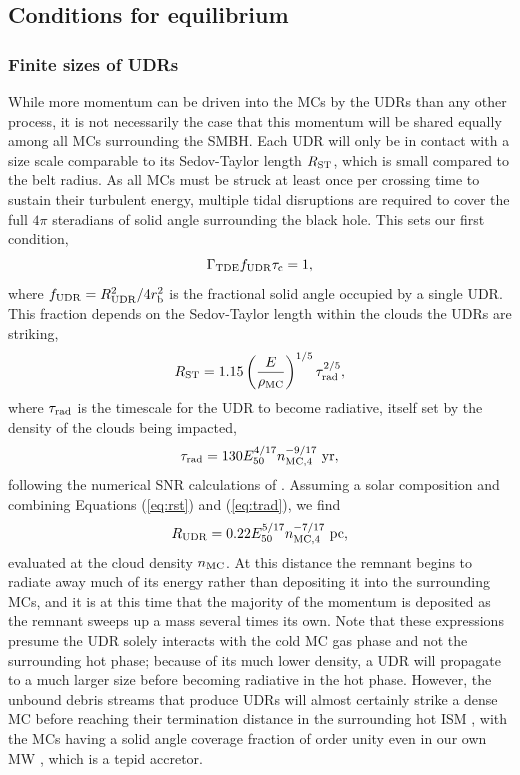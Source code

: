 \documentclass[preprint2]{aastex}
\begin{document}
\subsection{Conditions for equilibrium}\label{subsec:conditions}

\subsubsection{Finite sizes of UDRs}

While more momentum can be driven into the MCs by the UDRs than any other process, it is not necessarily the case that this momentum will be shared equally among all MCs surrounding the SMBH. Each UDR will only be in contact with a size scale comparable to its Sedov-Taylor length $R_{\rm ST}$, which is small compared to the belt radius. As all MCs must be struck at least once per crossing time to sustain their turbulent energy, multiple tidal disruptions are required to cover the full $4\pi$ steradians of solid angle surrounding the black hole. This sets our first condition,
\begin{equation}
\Gamma_{\rm TDE} f_{\rm UDR} \tau_{\rm c} = 1,\label{eq:cond1}
\end{equation}
where $f_{\rm UDR} = R_{\rm UDR}^{2}/4 r_{\rm b}^{2}$ is the fractional solid angle occupied by a single UDR. This fraction depends on the Sedov-Taylor length \citep{Sedov:1946a,Taylor:1950a} within the clouds the UDRs are striking,
\begin{equation}
R_{\rm ST} = 1.15 \left(\frac{E}{\rho_{\rm MC}}\right)^{1/5} \tau_{\rm rad}^{2/5},\label{eq:rst}
\end{equation}
where $\tau_{\rm rad}$ is the timescale for the UDR to become radiative, itself set by the density of the clouds being impacted,
\begin{equation}
\tau_{\rm rad} = 130 E_{50}^{4/17}n_{\rm MC,4}^{-9/17}~{\rm yr},\label{eq:trad}
\end{equation}
following the numerical SNR calculations of \citet{Blondin:1998a}. Assuming a solar composition and combining Equations (\ref{eq:rst}) and (\ref{eq:trad}), we find
\begin{equation}
R_{\rm UDR} = 0.22 E_{50}^{5/17} n_{\rm MC,4}^{-7/17}~{\rm pc},\label{eq:rudr}
\end{equation}
evaluated at the cloud density $n_{\rm MC}$. At this distance the remnant begins to radiate away much of its energy rather than depositing it into the surrounding MCs, and it is at this time that the majority of the momentum is deposited as the remnant sweeps up a mass several times its own. Note that these expressions presume the UDR solely interacts with the cold MC gas phase and not the surrounding hot phase; because of its much lower density, a UDR will propagate to a much larger size before becoming radiative in the hot phase. However, the unbound debris streams that produce UDRs will almost certainly strike a dense MC before reaching their termination distance in the surrounding hot ISM \citep{Guillochon:2016b}, with the MCs having a solid angle coverage fraction of order unity even in our own MW \citep{Chen:2016b}, which is a tepid accretor.
\end{document}
